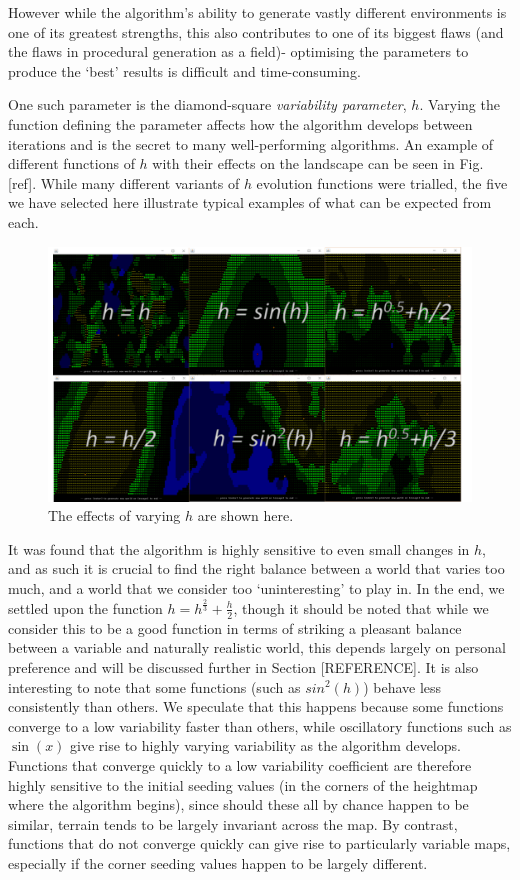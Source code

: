 \documentclass[12pt,a4paper]{article}
\begin{document}
However while the algorithm's ability to generate vastly different environments is one of its greatest strengths, this also contributes to one of its biggest flaws (and the flaws in procedural generation as a field)- optimising the parameters to produce the `best' results is difficult and time-consuming. 

One such parameter is the diamond-square \emph{variability parameter}, $h$. Varying the function defining the parameter affects how the algorithm develops between iterations and is the secret to many well-performing algorithms. An example of different functions of $h$ with their effects on the landscape can be seen in Fig. [ref]. While many different variants of $h$ evolution functions were trialled, the five we have selected here illustrate typical examples of what can be expected from each. 

\begin{figure}
  \centering
 	\includegraphics[width=0.8\linewidth]{images/varyingh.png}
	\caption[]{The effects of varying $h$ are shown here.}
	\label{fig:8}
\end{figure} 


It was found that the algorithm is highly sensitive to even small changes in $h$, and as such it is crucial to find the right balance between a world that varies too much, and a world that we consider too `uninteresting' to play in. In the end, we settled upon the function $h = h^\frac{2}{3} + \frac{h}{2}$, though it should be noted that while we consider this to be a good function in terms of striking a pleasant balance between a variable and naturally realistic world, this depends largely on personal preference and will be discussed further in Section [REFERENCE]. It is also interesting to note that some functions (such as $sin^2 (h)$) behave less consistently than others. We speculate that this happens because some functions converge to a low variability faster than others, while oscillatory functions such as $\sin(x)$ give rise to highly varying variability as the algorithm develops. Functions that converge quickly to a low variability coefficient are therefore highly sensitive to the initial seeding values (in the corners of the heightmap where the algorithm begins), since should these all by chance happen to be similar, terrain tends to be largely invariant across the map. By contrast, functions that do not converge quickly can give rise to particularly variable maps, especially if the corner seeding values happen to be largely different.     
\end{document}
